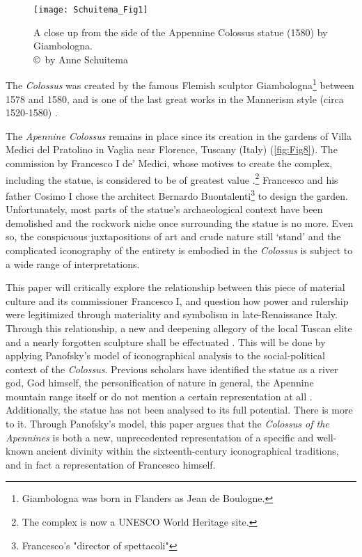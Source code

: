  \begin{figure}[!tb]
	\texttt{[image: Schuitema\_Fig1]}
	\centering
	\caption{A close up from the side of the Appennine Colossus statue (1580) by Giambologna.
		{\normalfont\scriptsize \\ \copyright\ by Anne Schuitema}
	}
	\label{fig:Fig1}
\end{figure}

The \textit{Colossus} was created by the famous Flemish sculptor Giambologna\footnote{Giambologna was born in Flanders as Jean de Boulogne.}  between 1578 and 1580, and is one of the last great works in the Mannerism style (circa 1520-1580) \parencites[68]{Burke1989}.

The \textit{Apennine Colossus} remains in place since its creation in the gardens of Villa Medici del Pratolino in Vaglia near Florence, Tuscany (Italy) (\cref{fig:Fig8}). The commission by Francesco I de’ Medici, whose motives to create the complex, including the statue, is considered to be of greatest value \parencites[16]{Walsh2015}.\footnote{The complex is now a UNESCO World Heritage site.} Francesco and his father Cosimo I chose the architect Bernardo Buontalenti\footnote{Francesco's "director of spettacoli"}  to design the garden. Unfortunately, most parts of the statue’s archaeological context have been demolished and the rockwork niche once surrounding the statue is no more. Even so, the conspicuous juxtapositions of art and crude nature still ‘stand’ and the complicated iconography of the entirety is embodied in the \textit{Colossus} is subject to a wide range of interpretations.

This paper will critically explore the relationship between this piece of material culture and its commissioner Francesco I, and question how power and rulership were legitimized through materiality and symbolism in late-Renaissance Italy. Through this relationship, a new and deepening allegory of the local Tuscan elite and a nearly forgotten sculpture shall be effectuated \parencites[164]{Meskell2009}. This will be done by applying Panofsky’s model of iconographical analysis to the social-political context of the \textit{Colossus}. Previous scholars have identified the statue as a river god, God himself, the personification of nature in general, the Apennine mountain range itself or do not mention a certain representation at all \parencites[7]{DElia2011}[31]{Sparitis2013}[70]{Lazzaro2011}. Additionally, the statue has not been analysed to its full potential. There is more to it. Through Panofsky’s model, this paper argues that the \textit{Colossus of the Apennines} is both a new, unprecedented representation of a specific and well-known ancient divinity within the sixteenth-century iconographical traditions, and in fact a representation of Francesco himself.

